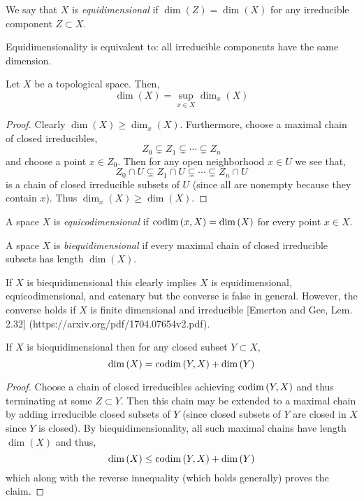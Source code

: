 \documentclass[12pt]{article}
\begin{document}
\begin{defn}
We say that $X$ is \textit{equidimensional} if $\dim{(Z)} = \dim{(X)}$ for any irreducible component $Z \subset X$.
\end{defn}

\begin{rmk}
Equidimensionality is equivalent to: all irreducible components have the same dimension.
\end{rmk}

\begin{prop}
Let $X$ be a topological space. Then,
\[ \dim{(X)} = \sup_{x \in X} \dim_{x}{(X)} \]
\end{prop}

\begin{proof}
Clearly $\dim{(X)} \ge \dim_{x}{(X)}$. Furthermore, choose a maximal chain of closed irreducibles,
\[  Z_0 \subsetneq Z_1 \subsetneq \cdots \subsetneq Z_n \]
and choose a point $x \in Z_0$. Then for any open neighborhood $x \in U$ we see that,
\[  Z_0 \cap U \subsetneq Z_1 \cap U \subsetneq \cdots \subsetneq Z_n \cap U \]
is a chain of closed irreducible subsets of $U$ (since all are nonempty because they contain $x$). Thus $\dim_{x}{(X)} \ge \dim{(X)}$.
\end{proof}


\begin{defn}
A space $X$ is \textit{equicodimensional} if $\mathrm{codim}\left( x, X \right) = \dim{(X)}$ for every point $x \in X$.
\end{defn}

\begin{defn}
A space $X$ is \textit{biequidimensional} if every maximal chain of closed irreducible subsets has length $\dim{(X)}$.
\end{defn}

\begin{rmk}
If $X$ is biequidimensional this clearly implies $X$ is equidimensional, equicodimensional, and catenary but the converse is false in general. However, the converse holds if $X$ is finite dimensional and irreducible [Emerton and Gee, Lem. 2.32] (https://arxiv.org/pdf/1704.07654v2.pdf).
\end{rmk}

\begin{lemma}
If $X$ is biequidimensional then for any closed subset $Y \subset X$,
\[ \dim{(X)} = \mathrm{codim}\left( Y, X \right) + \dim{(Y)} \]
\end{lemma}

\begin{proof}
Choose a chain of closed irreducibles achieving $\mathrm{codim}\left( Y, X \right)$ and thus terminating at some $Z \subset Y$. Then this chain may be extended to a maximal chain by adding irreducible closed subsets of $Y$ (since closed subsets of $Y$ are closed in $X$ since $Y$ is closed). By biequidimensionality, all such maximal chains have length $\dim{(X)}$ and thus,
\[ \dim{(X)} \le \mathrm{codim}\left( Y, X \right) + \dim{(Y)} \]
which along with the reverse innequality (which holds generally) proves the claim.
\end{proof}
\end{document}
